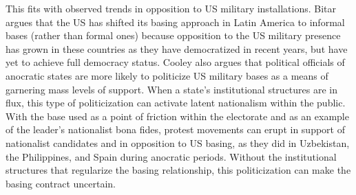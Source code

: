 		This fits with observed trends in opposition to US military installations. Bitar argues that the US has shifted its basing approach in Latin America to informal bases (rather than formal ones) because opposition to the US military presence has grown in these countries as they have democratized in recent years, but have yet to achieve full democracy status.\cite{Bitar2016} Cooley also argues that political officials of anocratic states are more likely to politicize US military bases as a means of garnering mass levels of support.\cite{Cooley2008} When a state's institutional structures are in flux, this type of politicization can activate latent nationalism within the public. With the base used as a point of friction within the electorate and as an example of the leader's nationalist bona fides, protest movements can erupt in support of nationalist candidates and in opposition to US basing, as they did in Uzbekistan, the Philippines, and Spain during anocratic periods. Without the institutional structures that regularize the basing relationship, this politicization can make the basing contract uncertain.\cite{stravers2018}
		
		
		
